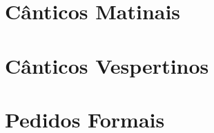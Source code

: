 
\morningPartSettings

\part{Cânticos Matinais}

\morningChapterSettings



\morningSettingsRestore

\eveningPartSettings

\part{Cânticos Vespertinos}

\eveningChapterSettings



\eveningSettingsRestore

\requestsPartSettings

\part{Pedidos Formais}

\requestsChapterSettings



\requestsSettingsRestore
